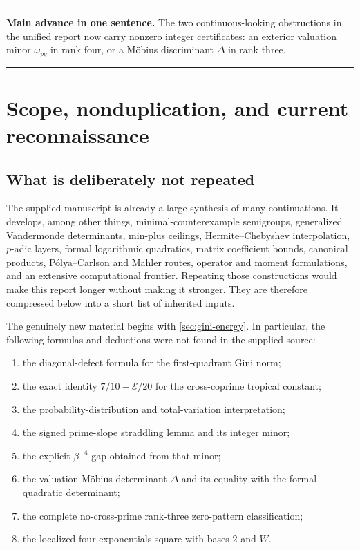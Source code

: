 \documentclass[11pt,oneside]{article}
\theoremstyle{research}
\theoremstyle{definition}
\newcommand{\E}{\mathcal E}
\newenvironment{resultbox}
  {\begin{center}\begin{minipage}{0.94\textwidth}\setlength{\parindent}{0pt}%
   \hrule\vspace{0.45em}}
  {\vspace{0.45em}\hrule\end{minipage}\end{center}}
\begin{document}
\begin{resultbox}
\textbf{Main advance in one sentence.}
The two continuous-looking obstructions in the unified report now carry
nonzero integer certificates: an exterior valuation minor $\omega_{pq}$ in
rank four, or a M\"obius discriminant $\Delta$ in rank three.
\end{resultbox}

\section{Scope, nonduplication, and current reconnaissance}

\subsection{What is deliberately not repeated}

The supplied manuscript is already a large synthesis of many continuations.
It develops, among other things, minimal-counterexample semigroups,
generalized Vandermonde determinants, min-plus ceilings, Hermite--Chebyshev
interpolation, $p$-adic layers, formal logarithmic quadratics, matrix
coefficient bounds, canonical products, P\'olya--Carlson and Mahler routes,
operator and moment formulations, and an extensive computational frontier.
Repeating those constructions would make this report longer without making it
stronger.  They are therefore compressed below into a short list of inherited
inputs.

The genuinely new material begins with \cref{sec:gini-energy}.  In particular,
the following formulas and deductions were not found in the supplied source:
\begin{enumerate}[label=(N\arabic*),leftmargin=2.7em]
\item the diagonal-defect formula for the first-quadrant Gini norm;
\item the exact identity $7/10-\E/20$ for the cross-coprime tropical constant;
\item the probability-distribution and total-variation interpretation;
\item the signed prime-slope straddling lemma and its integer minor;
\item the explicit $\beta^{-4}$ gap obtained from that minor;
\item the valuation M\"obius determinant $\Delta$ and its equality with the
      formal quadratic determinant;
\item the complete no-cross-prime rank-three zero-pattern classification;
\item the localized four-exponentials square with bases $2$ and $W$.
\end{enumerate}
\end{document}
